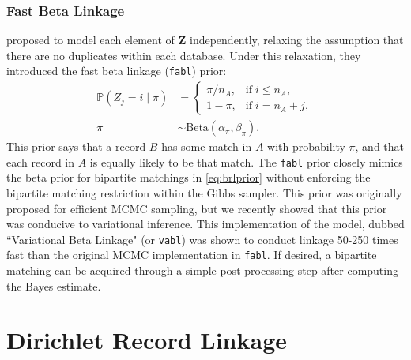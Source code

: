 \documentclass[12pt,letterpaper]{article}
\newcommand{\1}[1]{\mathbb{I}\!\left[#1\right]} %
\begin{document}
\subsubsection{Fast Beta Linkage}\label{sec:fabl}

\cite{kundinger_2023} proposed to model each element of $\bm{Z}$ independently, relaxing the assumption that there are no duplicates within each database. Under this relaxation, they introduced the fast beta linkage (\texttt{fabl}) prior:
\begin{align}
	\mathbb{P}(Z_j = i \mid \pi) 
	&=
	\begin{cases}
		\pi/n_A,  &  \text{if}  \; i\leq n_A,\\
		1- \pi, &   \text{if}  \;  i= n_A + j,
	\end{cases}\label{eqn:fabl} \\
	\pi &\sim \text{Beta}(\alpha_{\pi}, \beta_{\pi}) \label{eqn:pi_beta}.
\end{align}
This prior says that a record $B$ has some match in $A$ with probability $\pi$, and that each record in $A$ is equally likely to be that match. The \texttt{fabl} prior closely mimics the beta prior for bipartite matchings in \eqref{eq:brlprior} without enforcing the bipartite matching restriction within the Gibbs sampler. This prior was originally proposed for efficient MCMC sampling, but we recently showed that this prior was conducive to variational inference. This implementation of the model, dubbed ``Variational Beta Linkage" (or \texttt{vabl}) was shown to conduct linkage 50-250 times fast than the original MCMC implementation in \texttt{fabl}\citep{kundinger_2024_vabl}. If desired, a bipartite matching can be acquired through a simple post-processing step after computing the Bayes estimate. 

\section{Dirichlet Record Linkage}\label{sec:drl}

\end{document}
